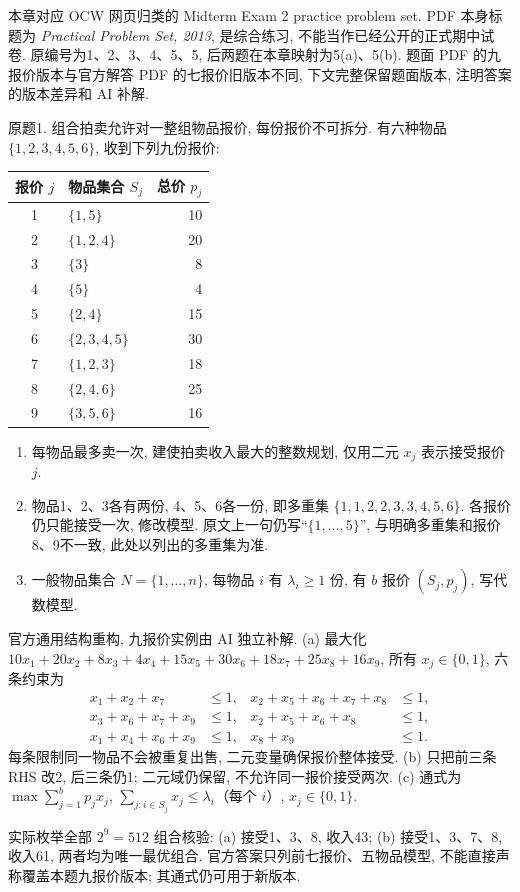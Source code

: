 \label{ass:15053-practice}
本章对应 OCW 网页归类的 Midterm Exam 2 practice problem set. PDF 本身标题为 \emph{Practical Problem Set, 2013}, 是综合练习, 不能当作已经公开的正式期中试卷. 原编号为1、2、3、4、5、5, 后两题在本章映射为5(a)、5(b). 题面 PDF 的九报价版本与官方解答 PDF 的七报价旧版本不同, 下文完整保留题面版本, 注明答案的版本差异和 AI 补解.

\begin{exercise}\label{ass:15053-practice-q1}
原题1. 组合拍卖允许对一整组物品报价, 每份报价不可拆分. 有六种物品 $\{1,2,3,4,5,6\}$, 收到下列九份报价:
\begin{center}\begin{tabular}{c|l|r}报价 $j$&物品集合 $S_j$&总价 $p_j$\\\hline
1&$\{1,5\}$&10\\2&$\{1,2,4\}$&20\\3&$\{3\}$&8\\4&$\{5\}$&4\\5&$\{2,4\}$&15\\6&$\{2,3,4,5\}$&30\\7&$\{1,2,3\}$&18\\8&$\{2,4,6\}$&25\\9&$\{3,5,6\}$&16
\end{tabular}\end{center}
\begin{enumerate}[label=(\alph*)]
\item 每物品最多卖一次, 建使拍卖收入最大的整数规划, 仅用二元 $x_j$ 表示接受报价 $j$.
\item 物品1、2、3各有两份, 4、5、6各一份, 即多重集 $\{1,1,2,2,3,3,4,5,6\}$. 各报价仍只能接受一次, 修改模型. 原文上一句仍写“$\{1,\ldots,5\}$”, 与明确多重集和报价8、9不一致, 此处以列出的多重集为准.
\item 一般物品集合 $N=\{1,\ldots,n\}$, 每物品 $i$ 有 $\lambda_i\ge1$ 份, 有 $b$ 报价 $(S_j,p_j)$, 写代数模型.
\end{enumerate}
\end{exercise}
\begin{solution}
官方通用结构重构, 九报价实例由 AI 独立补解. (a) 最大化 $10x_1+20x_2+8x_3+4x_4+15x_5+30x_6+18x_7+25x_8+16x_9$, 所有 $x_j\in\{0,1\}$, 六条约束为
\[
\begin{aligned}
x_1+x_2+x_7&\le1,&x_2+x_5+x_6+x_7+x_8&\le1,\\
x_3+x_6+x_7+x_9&\le1,&x_2+x_5+x_6+x_8&\le1,\\
x_1+x_4+x_6+x_9&\le1,&x_8+x_9&\le1.
\end{aligned}
\]
每条限制同一物品不会被重复出售, 二元变量确保报价整体接受. (b) 只把前三条 RHS 改2, 后三条仍1; 二元域仍保留, 不允许同一报价接受两次. (c) 通式为 $\max\sum_{j=1}^bp_jx_j$, $\sum_{j:i\in S_j}x_j\le\lambda_i$（每个 $i$）, $x_j\in\{0,1\}$.

实际枚举全部 $2^9=512$ 组合核验: (a) 接受1、3、8, 收入43; (b) 接受1、3、7、8, 收入61, 两者均为唯一最优组合. 官方答案只列前七报价、五物品模型, 不能直接声称覆盖本题九报价版本; 其通式仍可用于新版本.
\end{solution}

